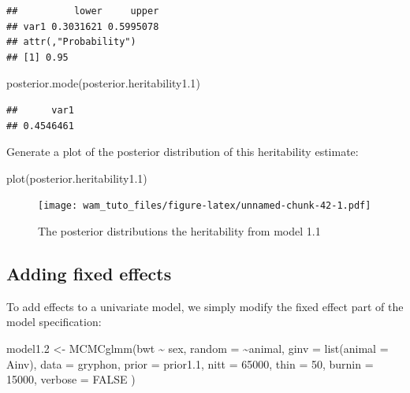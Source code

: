 \documentclass[
  12pt,
]{book}
\newenvironment{Shaded}{\begin{snugshade}}{\end{snugshade}}
\newcommand{\AttributeTok}[1]{\textcolor[rgb]{0.77,0.63,0.00}{#1}}
\newcommand{\ConstantTok}[1]{\textcolor[rgb]{0.00,0.00,0.00}{#1}}
\newcommand{\DecValTok}[1]{\textcolor[rgb]{0.00,0.00,0.81}{#1}}
\newcommand{\FloatTok}[1]{\textcolor[rgb]{0.00,0.00,0.81}{#1}}
\newcommand{\FunctionTok}[1]{\textcolor[rgb]{0.00,0.00,0.00}{#1}}
\newcommand{\NormalTok}[1]{#1}
\newcommand{\OtherTok}[1]{\textcolor[rgb]{0.56,0.35,0.01}{#1}}
\newcommand{\SpecialCharTok}[1]{\textcolor[rgb]{0.00,0.00,0.00}{#1}}
\begin{document}
\begin{verbatim}
##          lower     upper
## var1 0.3031621 0.5995078
## attr(,"Probability")
## [1] 0.95
\end{verbatim}

\begin{Shaded}
\begin{Highlighting}[]
\FunctionTok{posterior.mode}\NormalTok{(posterior.heritability1}\FloatTok{.1}\NormalTok{)}
\end{Highlighting}
\end{Shaded}

\begin{verbatim}
##      var1 
## 0.4546461
\end{verbatim}

Generate a plot of the posterior distribution of this heritability estimate:

\begin{Shaded}
\begin{Highlighting}[]
\FunctionTok{plot}\NormalTok{(posterior.heritability1}\FloatTok{.1}\NormalTok{)}
\end{Highlighting}
\end{Shaded}

\begin{figure}
\centering
\texttt{[image: wam\_tuto\_files/figure-latex/unnamed-chunk-42-1.pdf]}
\caption{\label{fig:unnamed-chunk-42}The posterior distributions the heritability from model 1.1}
\end{figure}

\hypertarget{adding-fixed-effects-1}{%
\subsection{Adding fixed effects}\label{adding-fixed-effects-1}}

To add effects to a univariate model, we simply modify the fixed effect part of the model specification:

\begin{Shaded}
\begin{Highlighting}[]
\NormalTok{model1}\FloatTok{.2} \OtherTok{\textless{}{-}} \FunctionTok{MCMCglmm}\NormalTok{(bwt }\SpecialCharTok{\textasciitilde{}}\NormalTok{ sex,}
  \AttributeTok{random =} \SpecialCharTok{\textasciitilde{}}\NormalTok{animal, }\AttributeTok{ginv =} \FunctionTok{list}\NormalTok{(}\AttributeTok{animal =}\NormalTok{ Ainv),}
  \AttributeTok{data =}\NormalTok{ gryphon, }\AttributeTok{prior =}\NormalTok{ prior1}\FloatTok{.1}\NormalTok{,}
  \AttributeTok{nitt =} \DecValTok{65000}\NormalTok{, }\AttributeTok{thin =} \DecValTok{50}\NormalTok{, }\AttributeTok{burnin =} \DecValTok{15000}\NormalTok{, }\AttributeTok{verbose =} \ConstantTok{FALSE}
\NormalTok{)}
\end{Highlighting}
\end{Shaded}
\end{document}
